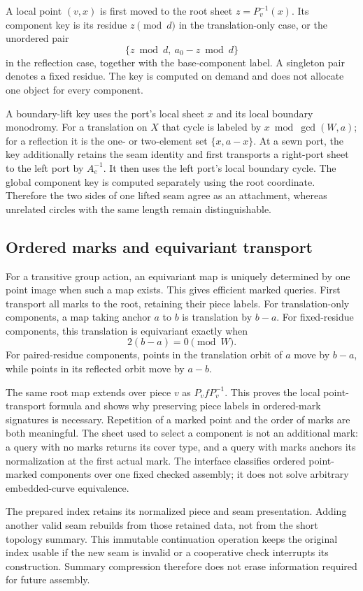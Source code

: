 \documentclass[11pt,a4paper]{article}
\theoremstyle{definition}\newtheorem{definition}[theorem]{Definition}
\theoremstyle{remark}\newtheorem{remark}[theorem]{Remark}
\begin{document}
A local point $(v,x)$ is first moved to the root sheet
$z=P_v^{-1}(x)$. Its component key is its residue $z\pmod d$ in the
translation-only case, or the unordered pair
\[
 \{z\bmod d,\ a_0-z\bmod d\}
\]
in the reflection case, together with the base-component label. A singleton
pair denotes a fixed residue. The key is computed on demand and does not
allocate one object for every component.

A boundary-lift key uses the port's local sheet $x$ and its local boundary
monodromy. For a translation on $X$ that cycle is labeled by
$x\bmod\gcd(W,a)$; for a reflection it is the one- or two-element set
$\{x,a-x\}$. At a sewn port, the key additionally retains the seam identity
and first transports a right-port sheet to the left port by $A_e^{-1}$.
It then uses the left port's local boundary cycle. The global component
key is computed separately using the root coordinate. Therefore
the two sides of one lifted seam agree as an attachment, whereas unrelated
circles with the same length remain distinguishable.

\subsection{Ordered marks and equivariant transport}

For a transitive group action, an equivariant map is uniquely determined by
one point image when such a map exists. This gives efficient marked queries.
First transport all marks to the root, retaining their piece labels. For
translation-only components, a map taking anchor $a$ to $b$ is translation
by $b-a$. For fixed-residue components, this translation is equivariant
exactly when
\[
 2(b-a)=0\pmod W.
\]
For paired-residue components, points in the translation orbit of $a$ move
by $b-a$, while points in its reflected orbit move by $a-b$.

The same root map extends over piece $v$ as
$P_v f P_v^{-1}$. This proves the local point-transport formula and shows
why preserving piece labels in ordered-mark signatures is necessary.
Repetition of a marked point and the order of marks are both meaningful.
The sheet used to select a component is not an additional mark: a query
with no marks returns its cover type, and a query with marks anchors its
normalization at the first actual mark. The interface classifies ordered point-marked components over one fixed
checked assembly; it does not solve arbitrary embedded-curve equivalence.

The prepared index retains its normalized piece and seam presentation.
Adding another valid seam rebuilds from those retained data, not from the
short topology summary. This immutable continuation operation keeps the
original index usable if the new seam is invalid or a cooperative check
interrupts its construction. Summary compression therefore does not erase
information required for future assembly.
\end{document}
